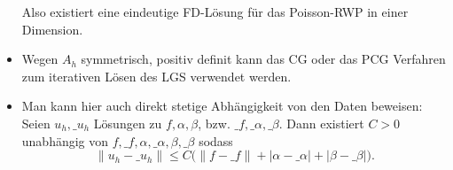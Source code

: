 \begin{ex}
\begin{note}
\begin{itemize}
				Also existiert eine eindeutige FD-Lösung für das Poisson-RWP in einer Dimension.
			\item
				Wegen $A_h$ symmetrisch, positiv definit kann das CG oder das PCG Verfahren zum iterativen Lösen des LGS verwendet werden.
			\item
				Man kann hier auch direkt stetige Abhängigkeit von den Daten beweisen:
				Seien $u_h, \_u_h$ Lösungen zu $f, \alpha, \beta$, bzw. $\_f, \_\alpha, \_\beta$.
				Dann existiert $C > 0$ unabhängig von $f, \_f, \alpha, \_\alpha, \beta, \_\beta$ sodass
				\[
					\|u_h - \_u_h\| \le C \Big( \|f-\_f\| + |\alpha - \_\alpha| + |\beta - \_\beta| \Big).
				\]
		\end{itemize}
	\end{note}
\end{ex}

